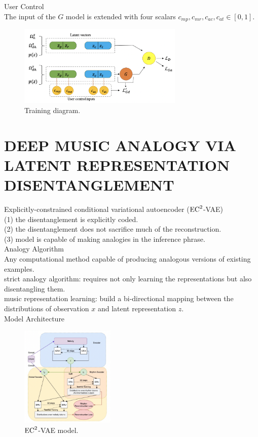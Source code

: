 \documentclass{article}
\begin{document}
\noindent
User Control\\
The input of the $G$ model is extended with four scalars $c_{mp}, c_{mr}, c_{ac}, c_{at} \in [0, 1]$.\\
\begin{figure}[H]
	\centerline{
   \includegraphics[width=0.7\textwidth]{Fig13.png}}
   \caption{Training diagram.}
   \label{fig:example}
\end{figure}

\section{DEEP MUSIC ANALOGY VIA LATENT REPRESENTATION DISENTANGLEMENT}
Explicitly-constrained conditional variational autoencoder (${\rm EC}^2$-VAE)\\
(1) the disentanglement is explicitly coded.\\
(2) the disentanglement does not sacrifice much of the reconstruction.\\
(3) model is capable of making analogies in the inference phrase.\\

\noindent
Analogy Algorithm\\
Any computational method capable of producing analogous versions of existing examples.\\
strict analogy algorithm: requires not only learning the representations but also disentangling them.\\
music representation learning: build a bi-directional mapping between the distributions of observation $x$ and latent representation $z$.\\

\noindent
Model Architecture
\begin{figure}[H]
	\centerline{
   \includegraphics[width=0.4\textwidth]{Fig14.png}}
   \caption{${\rm EC}^2$-VAE model.}
   \label{fig:example}
\end{figure}
\end{document}
